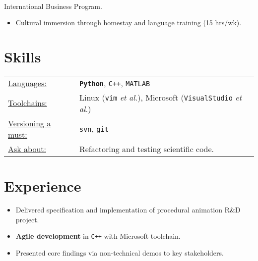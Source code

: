 \documentclass[margin, a4paper]{res}
\begin{document}
\begin{sloppypar}
\begin{resume}
\begin{itemize}


    \end{itemize}

\\
International Business Program.
    \begin{itemize}
        \item Cultural immersion through homestay and language training (15 hrs/wk). 
    \end{itemize}

\section{Skills}
\begin{tabular}{l p{3in}}
    \underline{Languages:} & \textbf{\texttt{Python}}, \texttt{C++}, \textsc{\texttt{MATLAB}} \\
    \underline{Toolchains:} & Linux (\texttt{vim} \textit{et al.}), Microsoft (\texttt{VisualStudio} \textit{et al.}) \\
    \underline{Versioning a must:} & \texttt{svn}, \texttt{git} \\
    \underline{Ask about:} & Refactoring and testing scientific code. %
\end{tabular}

\section{Experience}
\begin{itemize}
\item Delivered specification and implementation of procedural animation R\&D project.
\item \textbf{Agile development} in \texttt{C++} with Microsoft toolchain.
\item Presented core findings via non-technical demos to key stakeholders.


\end{itemize}
\end{resume}
\end{sloppypar}
\end{document}
